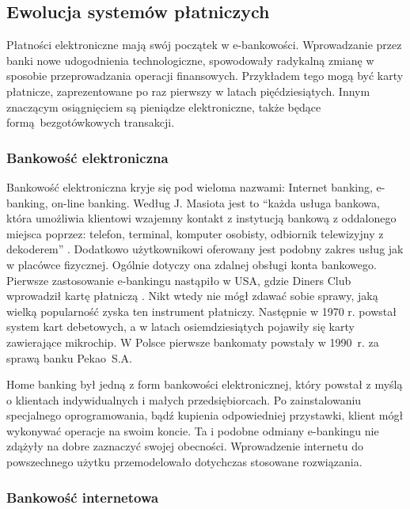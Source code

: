 \subsection{Ewolucja systemów płatniczych}

Płatności elektroniczne mają swój początek w e-bankowości. Wprowadzanie przez 
banki nowe udogodnienia technologiczne, 
spowodowały radykalną zmianę w sposobie przeprowadzania operacji finansowych. 
Przykładem tego mogą być karty płatnicze, zaprezentowane po raz pierwszy w 
latach pięćdziesiątych. Innym znaczącym osiągnięciem są pieniądze 
elektroniczne, także będące formą bezgotówkowych transakcji. 

\subsubsection*{Bankowość elektroniczna}

Bankowość elektroniczna kryje się pod wieloma nazwami: Internet banking, 
e-banking, on-line banking. Według J. Masiota jest to ``każda usługa bankowa, 
która umożliwia klientowi wzajemny kontakt z instytucją bankową z oddalonego 
miejsca poprzez: telefon, terminal, komputer osobisty, odbiornik telewizyjny z 
dekoderem'' \cite{pieniadz_elektroniczny-analiza}. Dodatkowo użytkownikowi 
oferowany jest podobny zakres usług jak w placówce fizycznej. Ogólnie dotyczy 
ona zdalnej obsługi konta bankowego. Pierwsze zastosowanie e-bankingu nastąpiło 
w USA, gdzie Diners Club wprowadził kartę płatniczą 
\cite{pieniadz_elektroniczny-analiza}. Nikt wtedy nie mógł zdawać sobie sprawy, 
jaką wielką popularność zyska ten instrument płatniczy. Następnie w 1970 r. 
powstał system kart debetowych, a w latach osiemdziesiątych pojawiły się  karty 
zawierające mikrochip. W Polsce pierwsze bankomaty powstały w 1990~r. za sprawą 
banku Pekao~S.A.

Home banking był jedną z form bankowości elektronicznej, który powstał z myślą 
o klientach indywidualnych i małych przedsiębiorcach. Po zainstalowaniu 
specjalnego oprogramowania, bądź kupienia odpowiedniej przystawki, klient mógł 
wykonywać operacje na swoim koncie. Ta i podobne odmiany e-bankingu nie zdążyły 
na dobre zaznaczyć swojej obecności. Wprowadzenie internetu do powszechnego 
użytku przemodelowało dotychczas stosowane rozwiązania.

\subsubsection*{Bankowość internetowa}

